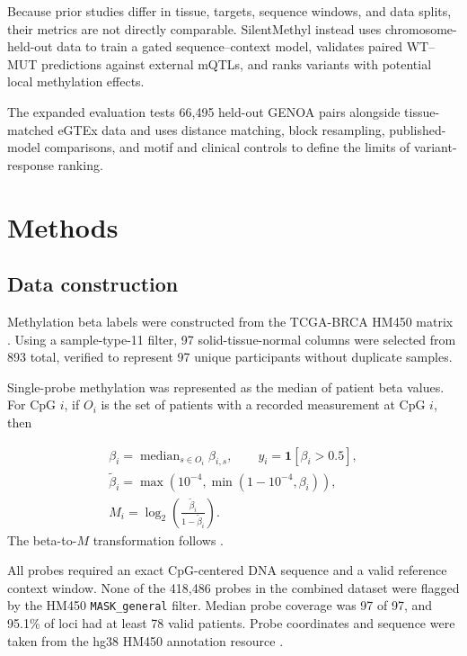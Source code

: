 \documentclass[10pt,letterpaper,twocolumn]{article}
\begin{document}
Because prior studies differ in tissue, targets, sequence windows, and data
splits, their metrics are not directly comparable. SilentMethyl instead uses
chromosome-held-out data to train a gated sequence--context model, validates
paired WT--MUT predictions against external mQTLs, and ranks variants with
potential local methylation effects.

{\color{addedred}
The expanded evaluation tests 66{,}495 held-out GENOA pairs alongside
tissue-matched eGTEx data and uses distance matching, block resampling,
published-model comparisons, and motif and clinical controls to define the
limits of variant-response ranking.
}

\section{Methods}

\subsection{Data construction}
Methylation beta labels were constructed from the TCGA-BRCA HM450
matrix \cite{tcga2012breast,grossman2016gdc}. Using a sample-type-11 filter, 97
solid-tissue-normal columns were selected from 893 total, verified to represent
97 unique participants without duplicate samples.

Single-probe methylation was represented as the median of patient beta values.
For CpG $i$, if $O_i$ is the set of patients with a recorded measurement at CpG
$i$, then

{\setlength{\abovedisplayskip}{4pt}
\setlength{\belowdisplayskip}{4pt}
\setlength{\abovedisplayshortskip}{4pt}
\setlength{\belowdisplayshortskip}{4pt}
\begin{gather*}
\beta_i = \operatorname{median}_{s\in O_i}\beta_{i,s},
\qquad y_i = \mathbf{1}[\beta_i>0.5],\\[1ex]
\widetilde{\beta}_i =
\max\left(10^{-4},\min\left(1-10^{-4},\beta_i\right)\right),\\[1ex]
M_i=\log_2\left(\frac{\widetilde{\beta}_i}{1-\widetilde{\beta}_i}\right).
\end{gather*}}
The beta-to-$M$ transformation follows \cite{du2010betamvalue}.

All probes required an exact CpG-centered DNA sequence and a valid reference
context window. None of the 418{,}486 probes in the combined dataset were flagged
by the HM450 \texttt{MASK\_general} filter. Median probe coverage was 97 of 97,
and 95.1\% of loci had at least 78 valid patients. Probe coordinates and sequence
were taken from the hg38 HM450 annotation
resource \cite{zhou2017infinium,chen2013crossreactive}.
\end{document}
